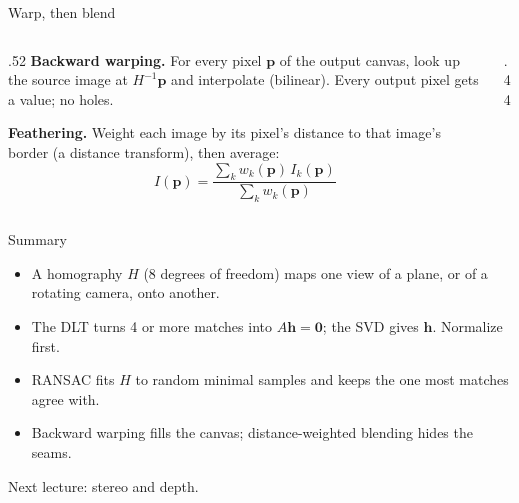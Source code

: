 \documentclass[aspectratio=169,11pt]{beamer}
\begin{document}
\begin{frame}{Warp, then blend}
  \begin{columns}[T]
    \begin{column}{.52\textwidth}
      \textbf{Backward warping.} For every pixel $\mathbf{p}$ of the output canvas, look up the source image at $H^{-1}\mathbf{p}$ and interpolate (bilinear). Every output pixel gets a value; no holes.
      \vspace{.8em}

      \textbf{Feathering.} Weight each image by its pixel's distance to that image's border (a distance transform), then average:
      \[
        I(\mathbf{p})=\frac{\sum_k w_k(\mathbf{p})\,I_k(\mathbf{p})}{\sum_k w_k(\mathbf{p})}
      \]
    \end{column}
    \begin{column}{.44\textwidth}
      \centering
    \end{column}
  \end{columns}
\end{frame}

\begin{frame}{Summary}
  \begin{itemize}\setlength{\itemsep}{.8em}
    \item A homography $H$ (8 degrees of freedom) maps one view of a plane, or of a rotating camera, onto another.
    \item The DLT turns 4 or more matches into $A\mathbf{h}=\mathbf{0}$; the SVD gives $\mathbf{h}$. Normalize first.
    \item RANSAC fits $H$ to random minimal samples and keeps the one most matches agree with.
    \item Backward warping fills the canvas; distance-weighted blending hides the seams.
  \end{itemize}
  \vspace{1.2em}
  {\small\color{muted} Next lecture: stereo and depth.}
\end{frame}
\end{document}
